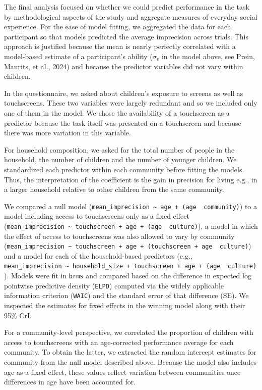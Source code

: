 \documentclass[
  man,floatsintext]{apa7}
\begin{document}
The final analysis focused on whether we could predict performance in the task by methodological aspects of the study and aggregate measures of everyday social experience. For the ease of model fitting, we aggregated the data for each participant so that models predicted the average imprecision across trials. This approach is justified because the mean is nearly perfectly correlated with a model-based estimate of a participant's ability (\(\sigma_v\) in the model above, see Prein, Maurits, et al., 2024) and because the predictor variables did not vary within children.

In the questionnaire, we asked about children's exposure to screens as well as touchscreens. These two variables were largely redundant and so we included only one of them in the model. We chose the availability of a touchscreen as a predictor because the task itself was presented on a touchscreen and because there was more variation in this variable.

For household composition, we asked for the total number of people in the household, the number of children and the number of younger children. We standardized each predictor within each community before fitting the models. Thus, the interpretation of the coefficient is the gain in precision for living e.g., in a larger household relative to other children from the same community.

We compared a null model (\texttt{mean\_imprecision\ \textasciitilde{}\ age\ +\ (age\ \textbar{}\ community)}) to a model including access to touchscreens only as a fixed effect (\texttt{mean\_imprecision\ \textasciitilde{}\ touchscreen\ +\ age\ +\ (age\ \textbar{}\ culture)}), a model in which the effect of access to touchscreens was also allowed to vary by community (\texttt{mean\_imprecision\ \textasciitilde{}\ touchscreen\ +\ age\ +\ (touchscreen\ +\ age\ \textbar{}\ culture)}) and a model for each of the household-based predictors (e.g., \texttt{mean\_imprecision\ \textasciitilde{}\ household\_size\ +\ touchscreen\ +\ age\ +\ (age\ \textbar{}\ culture)}). Models were fit in \texttt{brms} and compared based on the difference in expected log pointwise predictive density (\texttt{ELPD}) computed via the widely applicable information criterion (\texttt{WAIC}) and the standard error of that difference (SE). We inspected the estimates for fixed effects in the winning model along with their 95\% CrI.

For a community-level perspective, we correlated the proportion of children with access to touchscreens with an age-corrected performance average for each community. To obtain the latter, we extracted the random intercept estimates for community from the null model described above. Because the model also includes age as a fixed effect, these values reflect variation between communities once differences in age have been accounted for.
\end{document}
